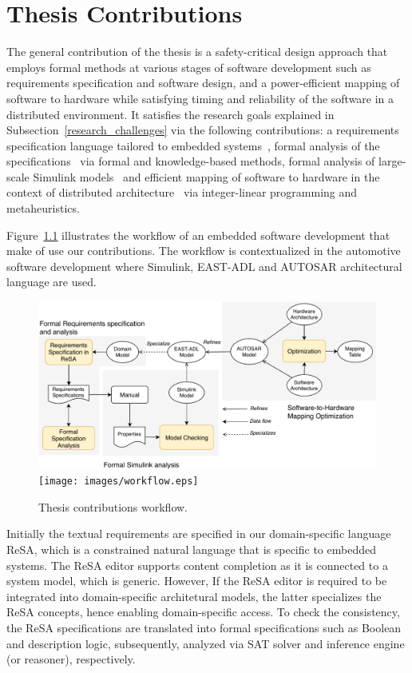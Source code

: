 \chapter{Thesis Contributions}
The general contribution of the thesis is a safety-critical design approach that employs formal methods at various stages of software development such as requirements specification and software design, and a power-efficient mapping of software to hardware while satisfying timing and reliability of the software in a distributed environment. It satisfies the research goals explained in Subsection~\ref{research_challenges} via the following contributions: a requirements specification language tailored to embedded systems~\cite{Mahmud2015ReSA:Systems}\cite{resatool}, formal analysis of the specifications~\cite{resatool}\cite{Mahmud2017SpecificationLogic} via formal and knowledge-based methods, formal analysis of large-scale Simulink models~\cite{Filipovikj2018SimppaalModels} and efficient mapping of software to hardware in the context of distributed architecture~\cite{Mahmud5222}\cite{Mahmud2019Power-awareOptimization} via integer-linear programming and metaheuristics. 

Figure~\ref{fig_workflow} illustrates the workflow of an embedded software development that make of use our contributions. The workflow is contextualized in the automotive software development where Simulink, EAST-ADL and AUTOSAR architectural language are used. 
\begin{figure}[h]
	\centering
	\ifpdf
	\includegraphics[width=\linewidth]{images/workflow}
	\else
	\texttt{[image: images/workflow.eps]}
	\fi
	\caption{Thesis contributions workflow.} 
	\label{fig_workflow}
\end{figure}

Initially the textual requirements are specified in our domain-specific language ReSA, which is a constrained natural language that is specific to embedded systems. The ReSA editor supports content completion as it is connected to a system model, which is generic. However, If the ReSA editor is required to be integrated into  domain-specific architetural models, the latter specializes the ReSA concepts, hence enabling domain-specific access. To check the consistency, the ReSA specifications are translated into formal specifications such as Boolean and description logic, subsequently, analyzed via SAT solver and inference engine (or reasoner), respectively.

